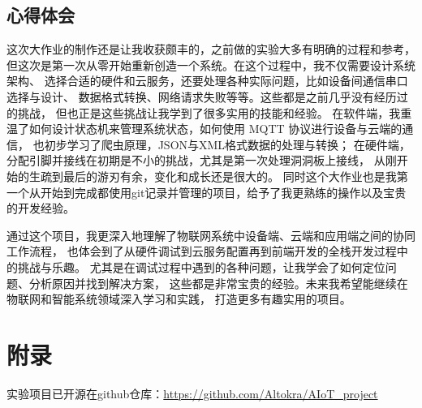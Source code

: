 \documentclass[12pt,hyperref,a4paper,UTF8]{ctexart}
\begin{document}
\subsection{心得体会}

这次大作业的制作还是让我收获颇丰的，之前做的实验大多有明确的过程和参考，
但这次是第一次从零开始重新创造一个系统。在这个过程中，我不仅需要设计系统架构、
选择合适的硬件和云服务，还要处理各种实际问题，比如设备间通信串口选择与设计、
数据格式转换、网络请求失败等等。这些都是之前几乎没有经历过的挑战，
但也正是这些挑战让我学到了很多实用的技能和经验。
在软件端，我重温了如何设计状态机来管理系统状态，如何使用 MQTT 协议进行设备与云端的通信，
也初步学习了爬虫原理，JSON与XML格式数据的处理与转换；
在硬件端，分配引脚并接线在初期是不小的挑战，尤其是第一次处理洞洞板上接线，
从刚开始的生疏到最后的游刃有余，变化和成长还是很大的。
同时这个大作业也是我第一个从开始到完成都使用git记录并管理的项目，给予了我更熟练的操作以及宝贵的开发经验。

通过这个项目，我更深入地理解了物联网系统中设备端、云端和应用端之间的协同工作流程，
也体会到了从硬件调试到云服务配置再到前端开发的全栈开发过程中的挑战与乐趣。
尤其是在调试过程中遇到的各种问题，让我学会了如何定位问题、分析原因并找到解决方案，
这些都是非常宝贵的经验。未来我希望能继续在物联网和智能系统领域深入学习和实践，
打造更多有趣实用的项目。

\newpage

\nocite{huawei-support}
\nocite{randomnerd-esp32-mfrc522}
\nocite{yhd-m803d-manual}
\nocite{lckfb-dht11}
\nocite{randomnerd-esp32-dht}
\nocite{espressif-devkitc-guide}
\nocite{isbn-work-api}
\nocite{ecslab-slibrary}



\appendix

\section{附录}

实验项目已开源在github仓库：\url{https://github.com/Altokra/AIoT\_project}
\end{document}
